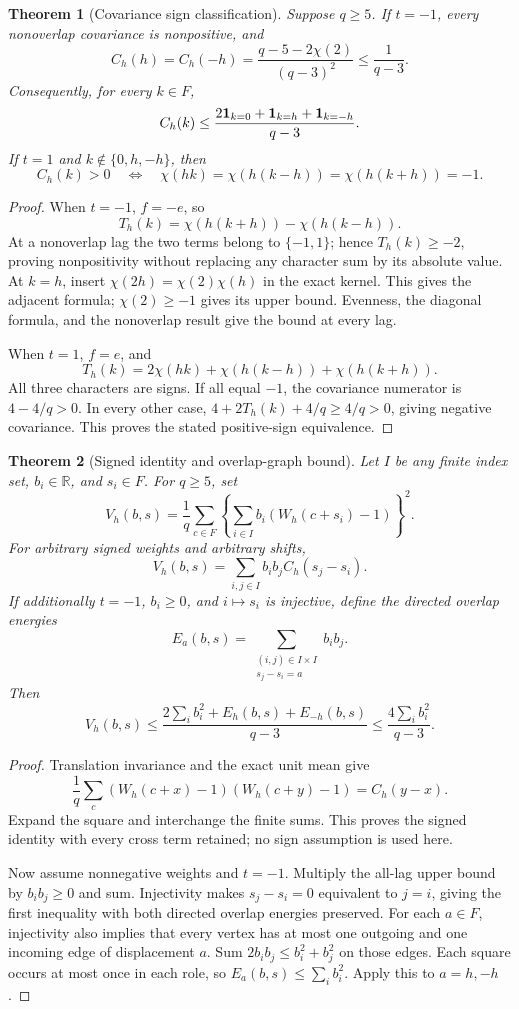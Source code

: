 \documentclass[11pt]{article}
\newtheorem{theorem}{Theorem}[section]
\begin{document}
\begin{theorem}[Covariance sign classification]\label{thm:trace-free-signs}
Suppose \(q\ge5\). If \(t=-1\), every nonoverlap covariance is
nonpositive, and
\[
 C_h(h)=C_h(-h)=\frac{q-5-2\chi(2)}{(q-3)^2}
             \le\frac1{q-3}.
\]
Consequently, for every \(k\in F\),
\[
 C_h(k)\le
 \frac{2{\bf1}_{k=0}+{\bf1}_{k=h}+{\bf1}_{k=-h}}{q-3}.
\]
If \(t=1\) and \(k\notin\{0,h,-h\}\), then
\[
 C_h(k)>0\quad\Longleftrightarrow\quad
 \chi(hk)=\chi(h(k-h))=\chi(h(k+h))=-1.
\]
\end{theorem}
\begin{proof}
When \(t=-1\), \(f=-e\), so
\[
 T_h(k)=\chi(h(k+h))-\chi(h(k-h)).
\]
At a nonoverlap lag the two terms belong to \(\{-1,1\}\);
hence \(T_h(k)\ge-2\), proving nonpositivity without replacing any
character sum by its absolute value. At \(k=h\), insert
\(\chi(2h)=\chi(2)\chi(h)\) in the exact kernel.
This gives the adjacent formula; \(\chi(2)\ge-1\) gives its upper
bound. Evenness, the diagonal formula, and the nonoverlap result give
the bound at every lag.

When \(t=1\), \(f=e\), and
\[
 T_h(k)=2\chi(hk)+\chi(h(k-h))+\chi(h(k+h)).
\]
All three characters are signs. If all equal \(-1\), the covariance
numerator is \(4-4/q>0\). In every other case,
\(4+2T_h(k)+4/q\ge4/q>0\), giving negative covariance.
This proves the stated positive-sign equivalence.
\end{proof}

\begin{theorem}[Signed identity and overlap-graph bound]
\label{thm:trace-free-window-graph}
Let \(I\) be any finite index set, \(b_i\in\mathbb R\), and \(s_i\in F\).
For \(q\ge5\), set
\[
 V_h(b,s)=\frac1q\sum_{c\in F}
       \left\{\sum_{i\in I}b_i(W_h(c+s_i)-1)\right\}^2.
\]
For arbitrary signed weights and arbitrary shifts,
\[
 V_h(b,s)=\sum_{i,j\in I}b_ib_jC_h(s_j-s_i).
\]
If additionally \(t=-1\), \(b_i\ge0\), and \(i\mapsto s_i\) is
injective, define the directed overlap energies
\[
 E_a(b,s)=
 \sum_{\substack{(i,j)\in I\times I\\s_j-s_i=a}}b_ib_j.
\]
Then
\[
 \boxed{\quad
 V_h(b,s)\le
 \frac{2\sum_i b_i^2+E_h(b,s)+E_{-h}(b,s)}{q-3}
 \le\frac{4\sum_i b_i^2}{q-3}.
 \quad}
\]
\end{theorem}
\begin{proof}
Translation invariance and the exact unit mean give
\[
 \frac1q\sum_c(W_h(c+x)-1)(W_h(c+y)-1)=C_h(y-x).
\]
Expand the square and interchange the finite sums. This proves the
signed identity with every cross term retained; no sign assumption is
used here.

Now assume nonnegative weights and \(t=-1\).
Multiply the all-lag upper bound by \(b_ib_j\ge0\) and sum.
Injectivity makes \(s_j-s_i=0\) equivalent to \(j=i\), giving the
first inequality with both directed overlap energies preserved.
For each \(a\in F\), injectivity also implies that every vertex has
at most one outgoing and one incoming edge of displacement \(a\).
Sum \(2b_ib_j\le b_i^2+b_j^2\) on those edges. Each square occurs at
most once in each role, so \(E_a(b,s)\le\sum_i b_i^2\).
Apply this to \(a=h,-h\).
\end{proof}
\end{document}
